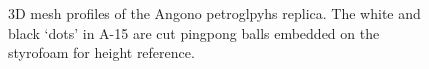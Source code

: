 \begin{figure}[h!]
	\centering
	\caption[3D view of Angono petroglyphs replica]{3D mesh profiles of the Angono petroglpyhs replica. The white and black `dots' in A-15 are cut pingpong balls embedded on the styrofoam for height reference.}
	\label{fig:3Dangono}
\end{figure}


